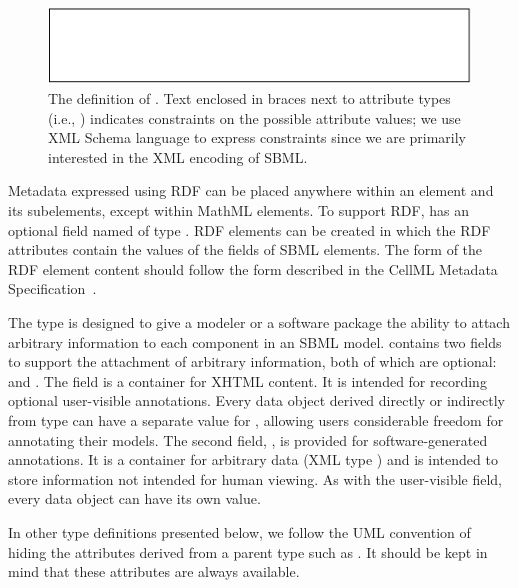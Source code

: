 \documentclass[10pt,twocolumntoc]{cekarticle}
\begin{document}
\begin{figure}[h]
  \vspace*{1ex}
  \centering
  \includegraphics[scale = 0.68]{identified}
  \caption{The definition of .  Text enclosed in braces next
    to attribute types (i.e., ) indicates
    constraints on the possible attribute values; we use XML Schema
    language to express constraints since we are primarily interested in
    the XML encoding of SBML.}
  \label{fig:sbase}
\end{figure}

Metadata expressed using RDF can be placed anywhere within an 
element and its subelements, except within MathML elements.  To support RDF,
 has an optional field named  of type
.  RDF  elements can be created in which the
RDF  attributes contain the values of the 
fields of SBML elements.  The form of the RDF element content should follow
the form described in the CellML Metadata
Specification~\citep{cuellar:2002}.

The type  is designed to give a modeler or a software package
the ability to attach arbitrary information to each component in an SBML
model.   contains two fields to support the attachment of
arbitrary information, both of which are optional:  and
. The field  is a container for XHTML
content.  It is intended for recording optional user-visible annotations.
Every data object derived directly or indirectly from type 
can have a separate value for , allowing users considerable
freedom for annotating their models.  The second field,
, is provided for software-generated annotations.  It is
a container for arbitrary data (XML type ) and is intended to
store information not intended for human viewing.  As with the user-visible
 field, every data object can have its own
 value.

In other type definitions presented below, we follow the UML convention of
hiding the attributes derived from a parent type such as . It
should be kept in mind that these attributes are always available.
\end{document}
